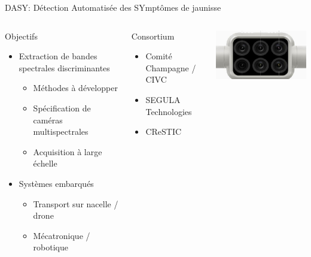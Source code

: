 \documentclass[presentation, aspectratio=169]{beamer}
\begin{document}
\begin{frame}{DASY: Détection Automatisée des SYmptômes de jaunisse}
  \begin{columns}
    \begin{block}{Objectifs}
      \begin{itemize}
      \item Extraction de bandes spectrales discriminantes
        \begin{itemize}
        \item Méthodes à développer
        \item Spécification de caméras multispectrales
        \item Acquisition à large échelle
        \end{itemize}
      \item Systèmes embarqués
        \begin{itemize}
        \item Transport sur nacelle / drone
        \item Mécatronique / robotique
        \end{itemize}
      \end{itemize}
    \end{block}

    \begin{block}{Consortium}
      \begin{itemize}
      \item Comité Champagne / CIVC
      \item SEGULA Technologies
      \item CReSTIC
      \end{itemize}
    \end{block}
    \includegraphics[width=.9\textwidth]{camera}
  \end{columns}
\end{frame}
\end{document}
